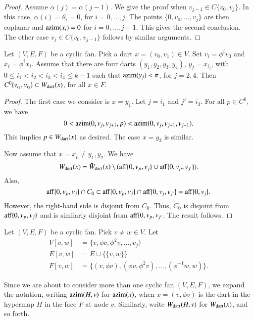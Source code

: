 {{\begin{proof}
Assume $\alpha(j)=\alpha(j-1)$.  We give the proof when $v_{j-1}\in C\{v_0,v_j\}$.    In this case, $\alpha(i)=\theta_i=0$, for $i=0,\ldots,j$.  The points $\{0,v_0,\ldots,v_j\}$ are then coplanar and ${\operatorname{azim}}(x_i)=0$ for $i=0,\ldots,j-1$.  This gives the second conclusion. The other case $v_j\in C\{v_0,v_{j-1}\}$ follows by similar arguments.
\end{proof}

\begin{lemma}  Let $(V,E,F)$ be a cyclic fan.  Pick a dart $x=(v_0,v_1)\in V$.  Set $v_i = \phi^i v_0$ and $x_i = \phi^i x_i$.  Assume that there are four darts $(y_1,y_2,y_3,y_4)$, $y_j = x_{i_j}$, with
$0\le i_1 < i_2 < i_3 < i_4\le k-1$ 
such that ${\operatorname{azim}}(y_j) < \pi$, for $j=2,4$.  
Then $C^0\{v_{i_1},v_{i_3}\} \subset W_{\text{dart}}(x)$, for all $x\in F$.
\end{lemma}

\begin{proof} The first case we consider is $x=y_1$.  Let $j=i_1$ and $j' = i_3$. For all $p\in C^0$, we have
$$
0 < {\operatorname{azim}}(0,v_{j},v_{j+1},p) < {\operatorname{azim}}(0,v_j,v_{j+1},v_{j-1}).
$$  
This implies $p\in W_{\text{dart}}(x)$ as desired.  The case $x=y_3$ is similar.

Now assume that $x=x_p\ne y_1,y_2$.  We have
$$
W_{\text{dart}}(x) = \bar W_{\text{dart}}(x)\setminus ({\operatorname{aff}}\{0,v_p,v_j\}\cup{\operatorname{aff}}\{0,v_p,v_{j'}\}).
$$
Also, 
$$
{\operatorname{aff}}\{0,v_p,v_j\}\cap C_0 \subset {\operatorname{aff}}\{0,v_p,v_j\}\cap {\operatorname{aff}}\{0,v_j,v_{j'}\} = {\operatorname{aff}}\{0,v_j\}.
$$
However, the right-hand side is disjoint from $C_0$.  Thus, $C_0$ is disjoint from ${\operatorname{aff}}\{0,v_p,v_j\}$ and is similarly disjoint from ${\operatorname{aff}}\{0,v_p,v_{j'}$.  The result follows.
\end{proof}

\begin{definition} Let $(V,E,F)$ be a cyclic fan.  Pick $v\ne w\in V$.
Let
$$
\begin{array}{lll}
V[v,w] &= \{v,\phi v,\phi^2 v,\ldots,v_j\}\\
E[v,w] &= E \cup \{\{v,w\}\}\\
F[v,w] &= \{(v,\phi v),(\phi v,\phi^2 v),\ldots,(\phi^{-1}w,w)\}.
\end{array}
$$
\end{definition}

Since we are about to consider more than one cyclic fan $(V,E,F)$, we expand the notation, writing ${\operatorname{azim}}(H,v)$ for ${\operatorname{azim}}(x)$, when $x=(v,\phi v)$ is the dart in the hypermap $H$ in the face $F$ at node $v$.  Similarly, write $W_{\text{dart}}(H,v)$ for $W_{\text{dart}}(x)$, and so forth.


}}
